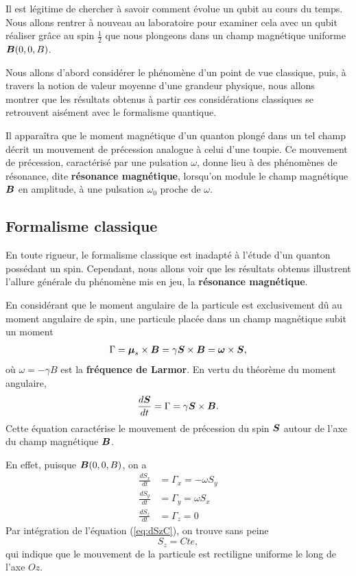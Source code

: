Il est légitime de chercher à savoir comment évolue un qubit au cours du temps.
Nous allons rentrer à nouveau au laboratoire pour examiner cela avec un qubit
réaliser grâce au spin $\frac{1}{2}$ que nous plongeons dans un champ magnétique
uniforme $\boldsymbol{B}(0,0,B)$.

Nous allons d'abord considérer le phénomène d'un point de vue classique, puis,
à travers la notion de valeur moyenne d'une grandeur physique, nous allons
montrer que les résultats obtenus à partir ces considérations classiques se
retrouvent aisément avec le formalisme quantique.

Il apparaîtra que le moment magnétique d'un quanton plongé dans un tel champ
décrit un mouvement de précession analogue à celui d'une toupie. Ce mouvement de
précession, caractérisé par une pulsation $\omega$, donne lieu à des phénomènes
de résonance, dite \textbf{résonance magnétique}, lorsqu'on module le champ
magnétique $\boldsymbol{B}$ en amplitude, à une pulsation $\omega_0$ proche de
$\omega$.

\subsection{Formalisme classique}

En toute rigueur, le formalisme classique est inadapté à l'étude d'un quanton
possédant un spin. Cependant, nous allons voir que les résultats obtenus
illustrent l'allure générale du phénomène mis en jeu, la \textbf{résonance
magnétique}.

En considérant que le moment angulaire de la particule est exclusivement dû au
moment angulaire de spin, une particule placée dans un champ magnétique subit un
moment
\begin{equation}
 \Gamma=\boldsymbol{\mu}_{s}\times\boldsymbol{B}=\gamma\boldsymbol{S}\times\boldsymbol{B}=\boldsymbol{\omega}
\times\boldsymbol{S},
\end{equation}
où $\omega=-\gamma B$  est la \textbf{fréquence de Larmor}. En vertu du théorème
du moment angulaire,
\begin{equation}
	\frac{d\boldsymbol{S}}{dt}=\Gamma=\gamma\boldsymbol{S}\times\boldsymbol{B}.
\end{equation}
Cette équation caractérise le mouvement de précession du spin $\boldsymbol{S}$ autour
de l'axe du champ magnétique $\boldsymbol{B}$.

En effet, puisque $\boldsymbol{B}(0,0,B)$, on a
\begin{subequations}
 \begin{align}
  \frac{dS_{x}}{dt} & =\Gamma_{x}=-\omega S_{y}\label{eq:dSxC}\\
  \frac{dS_{y}}{dt} & =\Gamma_{y}=\omega S_{x}\label{eq:dSyC}\\
  \frac{dS_z}{dt} & =\Gamma_z=0 \label{eq:dSzC}
 \end{align}
\end{subequations}
Par intégration de l'équation (\ref{eq:dSzC}), on trouve sans peine
\begin{equation}
 S_z=Cte,
\end{equation}
qui indique que le mouvement de la particule est rectiligne uniforme le long de
l'axe $Oz$.

